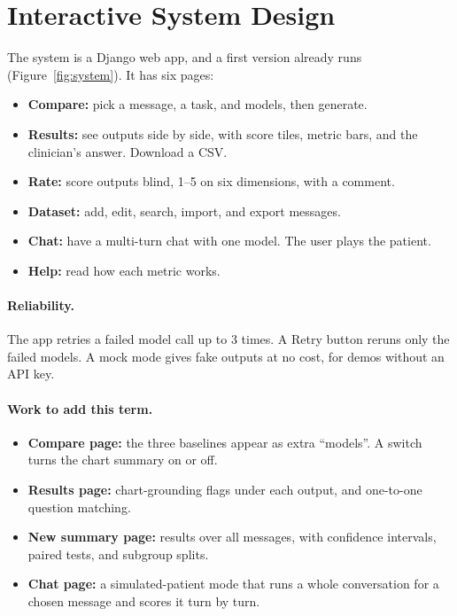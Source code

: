 \documentclass[11pt]{article}
\begin{document}
\section{Interactive System Design}

The system is a Django web app, and a first version already runs (Figure~\ref{fig:system}).
It has six pages:
\begin{itemize}
  \item \textbf{Compare:} pick a message, a task, and models, then generate.
  \item \textbf{Results:} see outputs side by side, with score tiles, metric bars, and the clinician's answer. Download a CSV.
  \item \textbf{Rate:} score outputs blind, 1--5 on six dimensions, with a comment.
  \item \textbf{Dataset:} add, edit, search, import, and export messages.
  \item \textbf{Chat:} have a multi-turn chat with one model. The user plays the patient.
  \item \textbf{Help:} read how each metric works.
\end{itemize}

\paragraph{Reliability.}
The app retries a failed model call up to 3 times.
A Retry button reruns only the failed models.
A mock mode gives fake outputs at no cost, for demos without an API key.

\paragraph{Work to add this term.}
\begin{itemize}
  \item \textbf{Compare page:} the three baselines appear as extra ``models''. A switch turns the chart summary on or off.
  \item \textbf{Results page:} chart-grounding flags under each output, and one-to-one question matching.
  \item \textbf{New summary page:} results over all messages, with confidence intervals, paired tests, and subgroup splits.
  \item \textbf{Chat page:} a simulated-patient mode that runs a whole conversation for a chosen message and scores it turn by turn.
\end{itemize}
\end{document}
